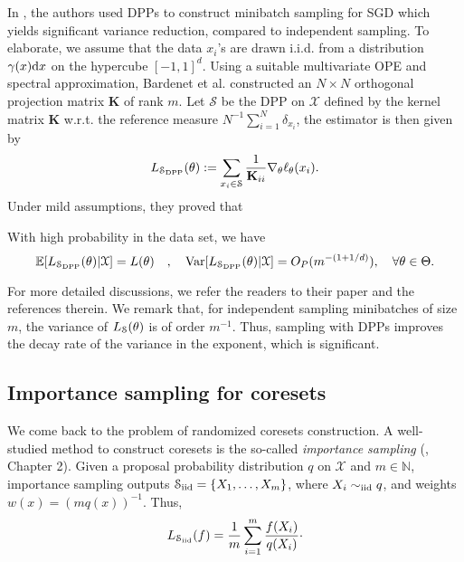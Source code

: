 In \cite{OPE-NIPS}, the authors used DPPs to construct minibatch sampling for SGD which yields significant variance reduction, compared to independent sampling. To elaborate, we assume that the data $x_i$'s are drawn i.i.d. from a distribution $\gamma(x)\mathrm{d} x$ on the hypercube $[-1,1]^d$. Using a suitable multivariate OPE and spectral approximation, Bardenet et al. constructed an $N\times N$ orthogonal projection matrix $\mathbf{K}$ of rank $m$. Let $\mathcal S$ be the DPP on $\mathcal X$ defined by the kernel matrix $\mathbf K$ w.r.t. the reference measure $N^{-1} \sum_{i=1}^N \delta_{x_i}$, the estimator is then given by
\[ L_{\mathcal S_{\mathrm{DPP}}}(\theta) := \sum_{x_i \in \mathcal S} \frac{1}{\mathbf K_{ii}} \nabla_\theta \ell_{\theta}(x_i). \]
Under mild assumptions, they proved that
\begin{theorem}
    With high probability in the data set, we have
    \[ \mathbb E [L_{\mathcal S_{\mathrm{DPP}}}(\theta) | \mathcal X] = L(\theta) \quad, \quad \mathrm{Var}[L_{\mathcal S_{\mathrm{DPP}}}(\theta)|\mathcal X] = O_P(m^{-(1+1/d)}), \quad \forall \theta \in \Theta. \]
\end{theorem}
For more detailed discussions, we refer the readers to their paper \cite{OPE-NIPS} and the references therein. We remark that, for independent sampling minibatches of size $m$, the variance of $L_{\mathcal{S}}(\theta)$ is of order $m^{-1}$. Thus, sampling with DPPs improves the decay rate of the variance in the exponent, which is significant.

\begin{comment}
    \subsection{Coreset construction}
 namely, to construct a random subset $\mathcal S$ of $\mathcal X$ and weights $w(x)$, such that $\mathcal S$ is an $\varepsilon$-coreset for the class $\mathcal F$ with high probability.
\end{comment}

\subsection{Importance sampling for coresets}
We come back to the problem of randomized coresets construction. 
A well-studied method to construct coresets is the so-called \emph{importance sampling} (\cite{bachem2017coresetML}, Chapter 2). Given a proposal probability distribution $q$ on $\mathcal X$ and $m\in \mathbb N$, importance sampling outputs $\mathcal S_{\mathrm{iid}} = \{X_1,\ldots,X_m\}$, where $X_i \sim_{\mathrm{iid}} q$, and weights $w(x)=(mq(x))^{-1}$. Thus, 
\begin{equation} \label{eq:coreset_iid}
    L_{\mathcal S_{\mathrm{iid}}}(f) = \frac{1}{m} \sum_{i=1}^m \frac{f(X_i)}{q(X_i)}\cdot
\end{equation}

